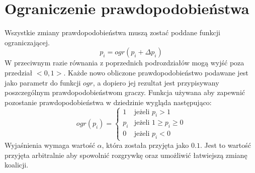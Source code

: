 \section{Ograniczenie prawdopodobieństwa}
\label{sec:ograniczenie}
Wszystkie zmiany prawdopodobieństwa muszą zostać poddane funkcji ograniczającej.
\begin{equation} \label{eq:ograniczenie}
p_i = ogr( p_i + \Delta p_i)
\end{equation}
W przeciwnym razie równania z poprzednich podrozdziałów mogą wyjść poza przedział $<0,1>$. Każde nowo obliczone prawdopodobieństwo podawane jest jako parametr do funkcji $ogr$, a dopiero jej rezultat jest przypisywany poszczególnym prawdopodobieństwom graczy. Funkcja używana aby zapewnić pozostanie prawdopodobieństwa w dziedzinie wygląda następująco:
\begin{displaymath}
ogr(p_i) = \left\{
\begin{array}{ll}
1 & \text{jeżeli } p_i > 1 \\
p_i & \text{jeżeli } 1 \geq p_i \geq 0 \\
0 & \text{jeżeli } p_i < 0
\end{array} 
\right.
\end{displaymath}
Wyjaśnienia wymaga wartość $\alpha$, która została przyjęta jako $0.1$. Jest to wartość przyjęta arbitralnie aby spowolnić rozgrywkę oraz umożliwić łatwiejszą zmianę koalicji. 


